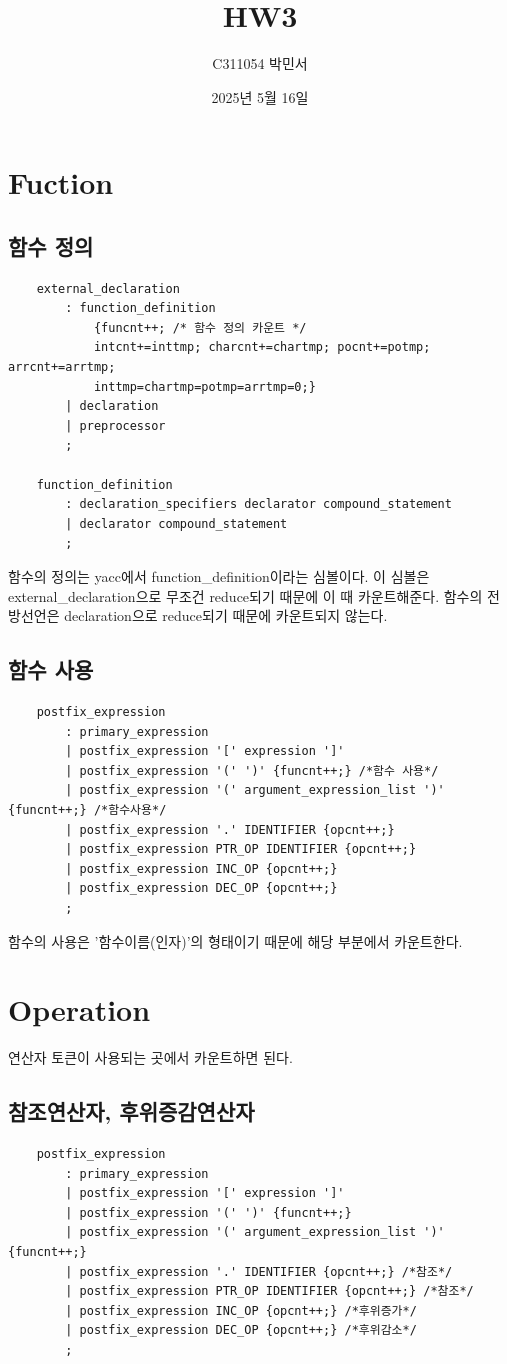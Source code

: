 \documentclass{oblivoir}
\title{HW3}
\author{C311054 박민서}
\date{2025년 5월 16일}
\begin{document}
\maketitle

\section{Fuction}
\subsection{함수 정의}
\begin{verbatim}
    external_declaration                                                                           
        : function_definition 
            {funcnt++; /* 함수 정의 카운트 */
            intcnt+=inttmp; charcnt+=chartmp; pocnt+=potmp; arrcnt+=arrtmp;
            inttmp=chartmp=potmp=arrtmp=0;}
        | declaration
        | preprocessor
        ;
    
    function_definition
        : declaration_specifiers declarator compound_statement
        | declarator compound_statement
        ;
\end{verbatim}
함수의 정의는 yacc에서 function\_definition이라는 심볼이다. 이 심볼은 external\_declaration으로 무조건 reduce되기 때문에 이 때 카운트해준다.
함수의 전방선언은 declaration으로 reduce되기 때문에 카운트되지 않는다.

\subsection{함수 사용}
\begin{verbatim}
    postfix_expression
        : primary_expression
        | postfix_expression '[' expression ']'
        | postfix_expression '(' ')' {funcnt++;} /*함수 사용*/
        | postfix_expression '(' argument_expression_list ')' {funcnt++;} /*함수사용*/
        | postfix_expression '.' IDENTIFIER {opcnt++;}
        | postfix_expression PTR_OP IDENTIFIER {opcnt++;}
        | postfix_expression INC_OP {opcnt++;}
        | postfix_expression DEC_OP {opcnt++;}
        ;
\end{verbatim}
함수의 사용은 '함수이름(인자)'의 형태이기 때문에 해당 부분에서 카운트한다.

\section{Operation}
연산자 토큰이 사용되는 곳에서 카운트하면 된다.
\subsection{참조연산자, 후위증감연산자}
\begin{verbatim}
    postfix_expression
        : primary_expression
        | postfix_expression '[' expression ']'
        | postfix_expression '(' ')' {funcnt++;} 
        | postfix_expression '(' argument_expression_list ')' {funcnt++;}
        | postfix_expression '.' IDENTIFIER {opcnt++;} /*참조*/
        | postfix_expression PTR_OP IDENTIFIER {opcnt++;} /*참조*/
        | postfix_expression INC_OP {opcnt++;} /*후위증가*/
        | postfix_expression DEC_OP {opcnt++;} /*후위감소*/
        ;
\end{verbatim}
\end{document}
